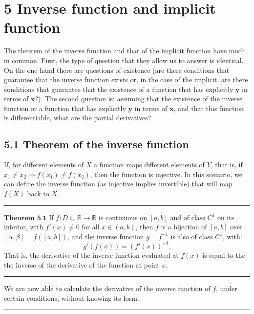 \documentclass[0pt, a4paper]{article}
\begin{document}
\clearpage

\section*{5 Inverse function and implicit function}


The theorem of the inverse function and that of the implicit function have much in common. First, the type of question that they allow us to answer is identical. On the one hand there are questions of existence (are there conditions that guarantee that the inverse function exists or, in the case of the implicit, are there conditions that guarantee that the existence of a function that has explicitly $\textbf{y}$ in terms of $\textbf{x}$?). The second question is: assuming that the existence of the inverse function or a function that has explicitly $\textbf{y}$ in terms of $\textbf{x}$, and that this function is differentiable, what are the partial derivatives?

\subsection*{5.1 Theorem of the inverse function}

If, for different elements of $X$ a function maps different elements of $Y$, that is, if $x_1\neq x_2 \Rightarrow f(x_1)\neq f(x_2)$, then the function is injective. In this scenario, we can define the inverse function (as injective implies invertible) that will map $f(X)$ back to $X$. 

\noindent\rule{\textwidth}{1pt}

$\textbf{Theorem 5.1}$ If $f:D\subseteq\mathbb{R}\to\mathbb{R}$ is continuous on $[a,b]$ and of class $C^1$ on its interior, with $f'(x)\neq0$ for all $x\in(a,b)$, then $f$ is a bijection of $[a,b]$ over $[\alpha,\beta]=f([a,b])$, and the inverse function $g=f^{-1}$ is also of class $C^1$, with:
$$g'(f(x))=\left(f'(x)\right)^{-1}.$$
That is, the derivative of the inverse function evaluated at $f(x)$ is equal to the the inverse of the derivative of the function at point $x$.

\noindent\rule{\textwidth}{1pt}

We are now able to calculate the derivative of the inverse function of $f$, under certain conditions, without knowing its form.

\noindent\rule{\textwidth}{1pt}
\end{document}
